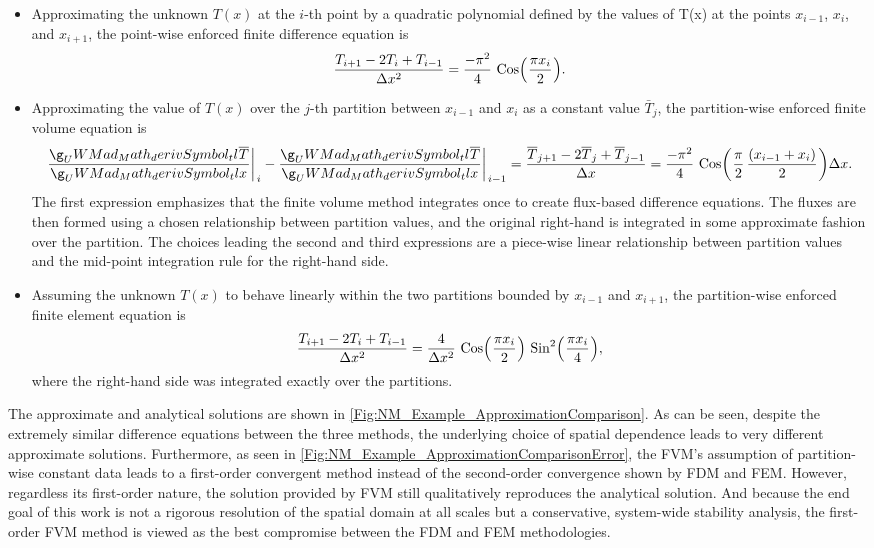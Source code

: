 \documentclass[12pt]{../UWMadThesis}
\begin{document}
\begin{itemize}
	\item{
        Approximating the unknown $T(x)$ at the $i$-th point by a quadratic polynomial defined by the values of T(x) at the points $x_{i-1}$, $x_{i}$, and $x_{i+1}$, the point-wise enforced finite difference equation is
        \begin{equation}
            \frac{T_{i+1} - 2 T_i + T_{i-1}}{\Delta{x}^2} = \frac{-\pi^2}{4}\,\Cos\left(\frac{\pi x_i}{2}\right).
        \end{equation}
    }
    \item{
        Approximating the value of $T(x)$ over the $j$-th partition between $x_{i-1}$ and $x_{i}$ as a constant value $\bar{T}_{j}$, the partition-wise enforced finite volume equation is
        \begin{equation}
            \deriv{\bar{T}}{x}\bigg\rvert_{i} - \deriv{\bar{T}}{x}\bigg\rvert_{i-1} = 
            \frac{\bar{T}_{j+1} - 2 \bar{T}_j + \bar{T}_{j-1}}{\Delta{x}} = \frac{-\pi^2}{4}\,\Cos\left(\frac{\pi}{2}\,\frac{(x_{i-1}+x_i)}{2}\right) \Delta{x}.
        \end{equation}
        The first expression emphasizes that the finite volume method integrates once to create flux-based difference equations.
        The fluxes are then formed using a chosen relationship between partition values, and the original right-hand is integrated in some approximate fashion over the partition.  The choices leading the second and third expressions are a piece-wise linear relationship between partition values and the mid-point integration rule for the right-hand side.
    }
    \item{
        Assuming the unknown $T(x)$ to behave linearly within the two partitions bounded by $x_{i-1}$ and $x_{i+1}$, the partition-wise enforced finite element equation is
        \begin{equation}
            \frac{T_{i+1} - 2 T_i + T_{i-1}}{\Delta{x}^2} = \frac{4}{\Delta{x}^2}\,\Cos\left(\frac{\pi x_i}{2}\right)\,\Sin^2\left(\frac{\pi x_i}{4}\right),
        \end{equation}
        where the right-hand side was integrated exactly over the partitions.
    }
\end{itemize}

The approximate and analytical solutions are shown in \cref{Fig:NM_Example_ApproximationComparison}.
As can be seen, despite the extremely similar difference equations between the three methods, the underlying choice of spatial dependence leads to very different approximate solutions.
Furthermore, as seen in \cref{Fig:NM_Example_ApproximationComparisonError}, the FVM's assumption of partition-wise constant data leads to a first-order convergent method instead of the second-order convergence shown by FDM and FEM.
However, regardless its first-order nature, the solution provided by FVM still qualitatively reproduces the analytical solution.
And because the end goal of this work is not a rigorous resolution of the spatial domain at all scales but a conservative, system-wide stability analysis, the first-order FVM method is viewed as the best compromise between the FDM and FEM methodologies.
\end{document}
